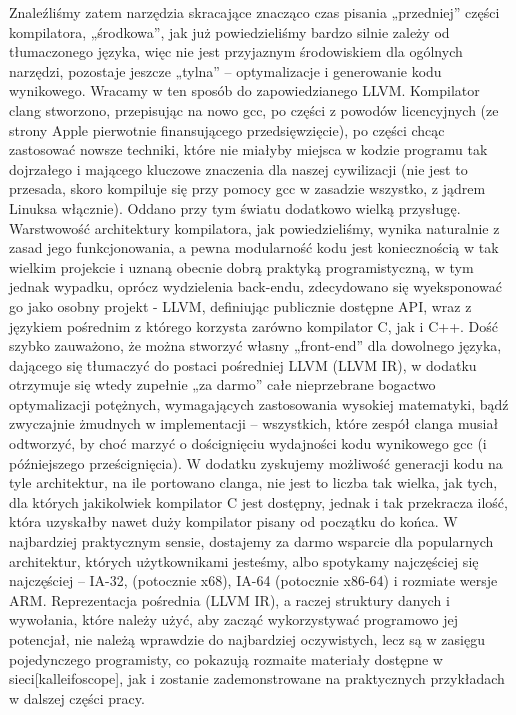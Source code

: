 Znaleźliśmy zatem narzędzia skracające znacząco czas pisania „przedniej” części kompilatora, „środkowa”, jak już powiedzieliśmy bardzo silnie zależy od tłumaczonego języka, więc nie jest przyjaznym środowiskiem dla ogólnych narzędzi, pozostaje jeszcze „tylna” – optymalizacje i generowanie kodu wynikowego. Wracamy w ten sposób do zapowiedzianego LLVM. 
Kompilator clang stworzono, przepisując na nowo gcc, po części z powodów licencyjnych (ze strony Apple pierwotnie finansującego przedsięwzięcie), po części chcąc zastosować nowsze techniki, które nie miałyby miejsca w kodzie programu tak dojrzałego i mającego kluczowe znaczenia dla naszej cywilizacji (nie jest to przesada, skoro kompiluje się przy pomocy gcc w zasadzie wszystko, z jądrem Linuksa włącznie). Oddano przy tym światu dodatkowo wielką przysługę. Warstwowość architektury kompilatora, jak powiedzieliśmy, wynika naturalnie z zasad jego funkcjonowania, a pewna modularność kodu jest koniecznością w tak wielkim projekcie i uznaną obecnie dobrą praktyką programistyczną, w tym jednak wypadku, oprócz wydzielenia back-endu, zdecydowano się wyeksponować go jako osobny projekt - LLVM, definiując publicznie dostępne API, wraz z językiem pośrednim z którego korzysta zarówno kompilator C, jak i C++. Dość szybko zauważono, że można stworzyć własny „front-end” dla dowolnego języka, dającego się tłumaczyć do postaci pośredniej LLVM (LLVM IR), w dodatku otrzymuje się wtedy zupełnie „za darmo” całe nieprzebrane bogactwo optymalizacji potężnych, wymagających zastosowania wysokiej matematyki, bądź zwyczajnie żmudnych w implementacji – wszystkich, które zespół clanga musiał odtworzyć, by choć marzyć o doścignięciu wydajności kodu wynikowego gcc (i późniejszego prześcignięcia). W dodatku zyskujemy możliwość generacji kodu na tyle architektur, na ile portowano clanga, nie jest to liczba tak wielka, jak tych, dla których jakikolwiek kompilator C jest dostępny, jednak i tak przekracza ilość, która uzyskałby nawet duży kompilator pisany od początku do końca. W najbardziej praktycznym sensie, dostajemy za darmo wsparcie dla popularnych architektur, których użytkownikami jesteśmy, albo spotykamy najczęściej się najczęściej – IA-32, (potocznie x68), IA-64 (potocznie x86-64) i rozmiate wersje ARM.
Reprezentacja pośrednia (LLVM IR), a raczej struktury danych i wywołania, które należy użyć, aby zacząć wykorzystywać programowo jej potencjał, nie należą wprawdzie do najbardziej oczywistych, lecz są w zasięgu pojedynczego programisty, co pokazują rozmaite materiały dostępne w sieci[kalleifoscope], jak i zostanie zademonstrowane na praktycznych przykładach w dalszej części pracy.

